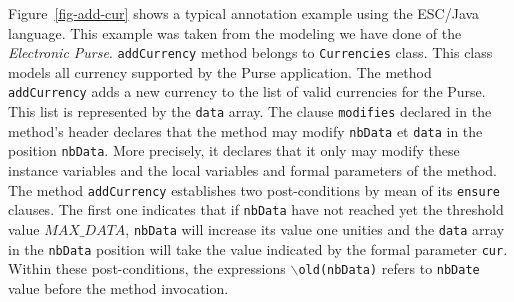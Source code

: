 \documentclass[a4paper]{llncs}
\begin{document}



Figure~\ref{fig-add-cur} shows a typical annotation example using the
ESC/Java language. This example was taken from the modeling 
we have done of the \textit{Electronic Purse}. \texttt{addCurrency}
method belongs to \texttt{Currencies} class. This class models all
currency supported by the Purse application. The method
\texttt{addCurrency} adds a new currency to the list of valid
currencies for the Purse. This list is represented by the
\texttt{data} array. The clause
\texttt{modifies} declared in the method's header declares
that the method may modify \texttt{nbData} et
\texttt{data} in the position \texttt{nbData}. More precisely, it
declares that it only may modify these instance variables and the local
variables and formal parameters of the method. The method
\texttt{addCurrency} establishes
two post-conditions by mean of its \texttt{ensure} clauses. The first
one indicates that if \texttt{nbData} have not reached yet the threshold
value $MAX\_DATA$, \texttt{nbData} will increase its value one
unities and the \texttt{data} array in the \texttt{nbData} position
will take the value indicated by the formal parameter
\texttt{cur}. Within these post-conditions, the expressions
\texttt{$\backslash$old(nbData)} refers to \texttt{nbDate} value
before the method invocation.
\end{document}
